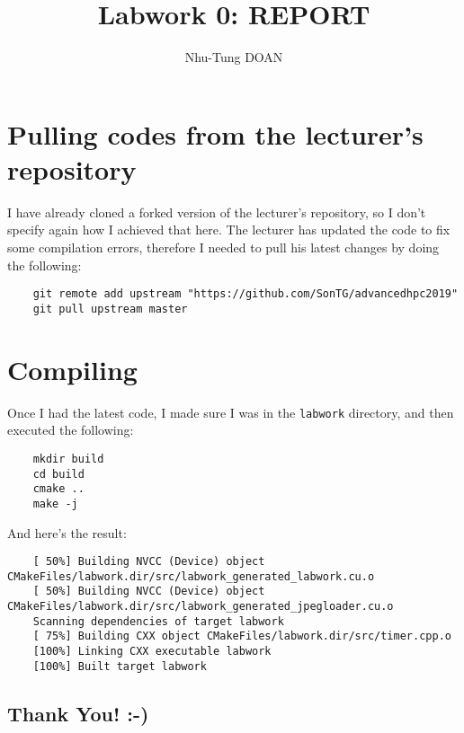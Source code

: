 \documentclass[10pt]{article}
\title {Labwork 0: REPORT}
\author{Nhu-Tung DOAN}
\date{}
\begin{document}
\maketitle

\section{Pulling codes from the lecturer's repository}
I have already cloned a forked version of the lecturer's repository, so I don't specify again how I achieved that here. The lecturer has updated the code to fix some compilation errors, therefore I needed to pull his latest changes by doing the following:
\begin{verbatim}
    git remote add upstream "https://github.com/SonTG/advancedhpc2019"
    git pull upstream master
\end{verbatim}

\section{Compiling}
Once I had the latest code, I made sure I was in the \verb+labwork+ directory, and then executed the following:
\begin{verbatim}
    mkdir build
    cd build
    cmake ..
    make -j
\end{verbatim}

And here's the result:
\begin{verbatim}
    [ 50%] Building NVCC (Device) object CMakeFiles/labwork.dir/src/labwork_generated_labwork.cu.o        
    [ 50%] Building NVCC (Device) object CMakeFiles/labwork.dir/src/labwork_generated_jpegloader.cu.o           
    Scanning dependencies of target labwork
    [ 75%] Building CXX object CMakeFiles/labwork.dir/src/timer.cpp.o
    [100%] Linking CXX executable labwork
    [100%] Built target labwork
\end{verbatim}

\subsection*{Thank You! :-)}
\end{document}
